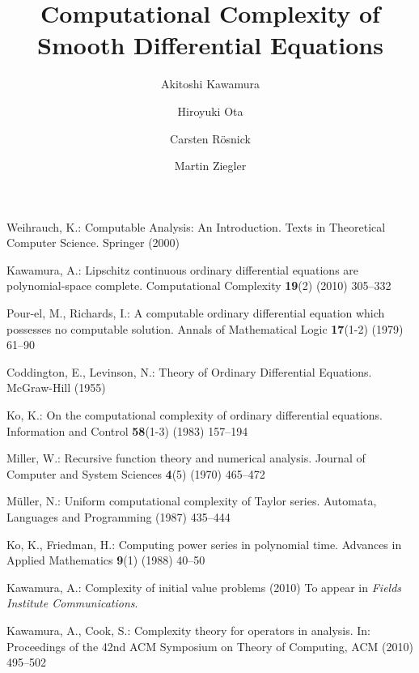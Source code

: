 \documentclass[envcountsame]{llncs}
\title{Computational Complexity of\\Smooth Differential Equations}
\author{%
Akitoshi Kawamura\inst{1}
\and
Hiroyuki Ota\inst{1}
\and
Carsten R\"osnick\inst{2}
\and
Martin Ziegler\inst{2}
}
\institute{%
University of Tokyo,  Tokyo, Japan\\
\and
Technische Universit\"at Darmstadt, Darmstadt, Germany}
\begin{document}
\maketitle








% 
% 
% 

\begin{thebibliography}{10}

Weihrauch, K.:
\newblock Computable Analysis: An Introduction.
\newblock Texts in Theoretical Computer Science. Springer (2000)

Kawamura, A.:
\newblock Lipschitz continuous ordinary differential equations are
  polynomial-space complete.
\newblock Computational Complexity \textbf{19}(2) (2010)  305--332

Pour-el, M., Richards, I.:
\newblock A computable ordinary differential equation which possesses no
  computable solution.
\newblock Annals of Mathematical Logic \textbf{17}(1-2) (1979)  61--90

Coddington, E., Levinson, N.:
\newblock Theory of Ordinary Differential Equations.
\newblock McGraw-Hill (1955)

Ko, K.:
\newblock On the computational complexity of ordinary differential equations.
\newblock Information and Control \textbf{58}(1-3) (1983)  157--194

Miller, W.:
\newblock Recursive function theory and numerical analysis.
\newblock Journal of Computer and System Sciences \textbf{4}(5) (1970)
  465--472

M{\"u}ller, N.:
\newblock Uniform computational complexity of {T}aylor series.
\newblock Automata, Languages and Programming (1987)  435--444

Ko, K., Friedman, H.:
\newblock Computing power series in polynomial time.
\newblock Advances in Applied Mathematics \textbf{9}(1) (1988)  40--50

Kawamura, A.:
\newblock Complexity of initial value problems (2010) To appear in {\em Fields
  Institute Communications}.

Kawamura, A., Cook, S.:
\newblock Complexity theory for operators in analysis.
\newblock In: Proceedings of the 42nd ACM Symposium on Theory of Computing, ACM
  (2010)  495--502


\end{thebibliography}
\end{document}
